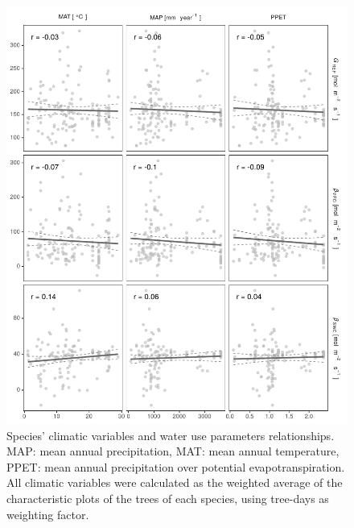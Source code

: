 \documentclass[11pt,twoside]{reedthesis}
\begin{document}
\begin{figure}[H]

{\centering \includegraphics[width=1\linewidth]{figure/appendixD/fig22} 

}

\caption{Species' climatic variables and water use parameters relationships. MAP: mean annual precipitation, MAT: mean annual temperature, PPET: mean annual precipitation over potential evapotranspiration. All climatic variables were calculated as the weighted average of the characteristic plots of the trees of each species, using tree-days as weighting factor.}\label{fig:climateparamplot}
\end{figure}
\end{document}
